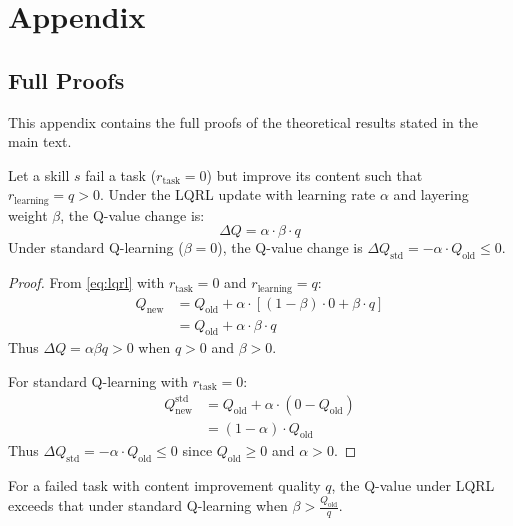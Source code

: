 \appendix
\section*{Appendix}

\subsection{Full Proofs}

This appendix contains the full proofs of the theoretical results stated in the main text.

\begin{theorem}
Let a skill $s$ fail a task ($r_{\text{task}} = 0$) but improve its content such that $r_{\text{learning}} = q > 0$. Under the LQRL update with learning rate $\alpha$ and layering weight $\beta$, the Q-value change is:
\begin{equation}
    \Delta Q = \alpha \cdot \beta \cdot q
\end{equation}
Under standard Q-learning ($\beta = 0$), the Q-value change is $\Delta Q_{\text{std}} = -\alpha \cdot Q_{\text{old}} \leq 0$.
\end{theorem}

\begin{proof}
From \cref{eq:lqrl} with $r_{\text{task}} = 0$ and $r_{\text{learning}} = q$:
\begin{align}
    Q_{\text{new}} &= Q_{\text{old}} + \alpha \cdot [(1-\beta) \cdot 0 + \beta \cdot q] \\
    &= Q_{\text{old}} + \alpha \cdot \beta \cdot q
\end{align}
Thus $\Delta Q = \alpha \beta q > 0$ when $q > 0$ and $\beta > 0$.

For standard Q-learning with $r_{\text{task}} = 0$:
\begin{align}
    Q_{\text{new}}^{\text{std}} &= Q_{\text{old}} + \alpha \cdot (0 - Q_{\text{old}}) \\
    &= (1 - \alpha) \cdot Q_{\text{old}}
\end{align}
Thus $\Delta Q_{\text{std}} = -\alpha \cdot Q_{\text{old}} \leq 0$ since $Q_{\text{old}} \geq 0$ and $\alpha > 0$.
\end{proof}

\begin{prop}
For a failed task with content improvement quality $q$, the Q-value under LQRL exceeds that under standard Q-learning when $\beta > \frac{Q_{\text{old}}}{q}$.
\end{prop}

